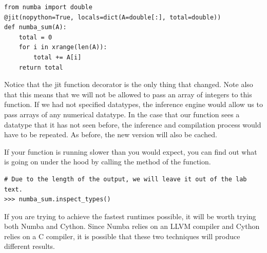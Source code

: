 \begin{lstlisting}
from numba import double
@jit(nopython=True, locals=dict(A=double[:], total=double))
def numba_sum(A):
    total = 0
    for i in xrange(len(A)):
        total += A[i]
    return total
\end{lstlisting}
Notice that the jit function decorator is the only thing that changed. Note also that this means that we will not be allowed to pass an array of integers to this function. If we had not specified datatypes, the inference engine would allow us to pass arrays of any numerical datatype. In the case that our function sees a datatype that it has not seen before, the inference and compilation process would have to be repeated. As before, the new version will also be cached.

If your function is running slower than you would expect, you can find out what is going on under the hood by calling the  method of the function.

\begin{lstlisting}
# Due to the length of the output, we will leave it out of the lab text.
>>> numba_sum.inspect_types()
\end{lstlisting}

If you are trying to achieve the fastest runtimes possible, it will be worth trying both Numba and Cython. Since Numba relies on an LLVM compiler and Cython relies on a C compiler, it is possible that these two techniques will produce different results. 

